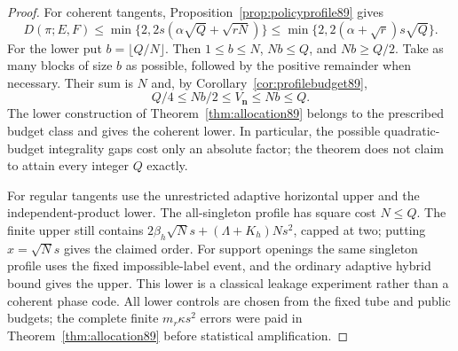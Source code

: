 \begin{proof}
For coherent tangents, Proposition~\ref{prop:policyprofile89} gives
\[
 D(\pi;E,F)\le\min\{2,2s(\alpha\sqrt Q+\sqrt{rN})\}
             \le\min\{2,2(\alpha+\sqrt r)s\sqrt Q\}.
\]
For the lower put $b=\lfloor Q/N\rfloor$.  Then $1\le b\le N$,
$Nb\le Q$, and $Nb\ge Q/2$.  Take as many blocks of size $b$ as
possible, followed by the positive remainder when necessary.
Their sum is $N$ and, by Corollary~\ref{cor:profilebudget89},
\[
 Q/4\le Nb/2\le V_{\boldsymbol n}\le Nb\le Q.
\]
The lower construction of Theorem~\ref{thm:allocation89} belongs to
the prescribed budget class and gives the coherent lower.  In
particular, the possible quadratic-budget integrality gaps cost only
an absolute factor; the theorem does not claim to attain every
integer $Q$ exactly.

For regular tangents use the unrestricted adaptive horizontal upper
and the independent-product lower.  The all-singleton profile has
square cost $N\le Q$.  The finite upper still contains
$2\beta_h\sqrt Ns+(\Lambda+K_h)Ns^2$, capped at two; putting
$x=\sqrt Ns$ gives the claimed order.  For support openings the same
singleton profile uses the fixed impossible-label event, and the
ordinary adaptive hybrid bound gives the upper.  This lower is a
classical leakage experiment rather than a coherent phase code.
All lower controls are chosen from the fixed tube and public budgets;
the complete finite $m_r\kappa s^2$ errors were paid in
Theorem~\ref{thm:allocation89} before statistical amplification.
\end{proof}

